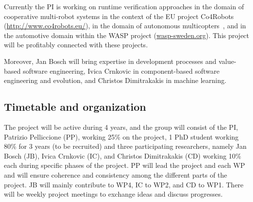 \documentclass[12pt]{article}
\newcommand{\nb}[2]{
    \fcolorbox{gray}{yellow}{\bfseries\sffamily\scriptsize#1}
    {\sf\small$\blacktriangleright$\textit{#2}$\blacktriangleleft$}
   }
\newcommand{\nb}[2]{}
\newcommand\patrizio[1]{\nb{Patrizio}{#1}}
\begin{document}
Currently the PI is working on runtime verification approaches in the domain of cooperative multi-robot systems in the context of the EU project Co4Robots ({\small \url{http://www.co4robots.eu/}}), in the domain of 
autonomous multicopters~\cite{ASE2015}, and in the automotive domain within the WASP project ({\small \url{wasp-sweden.org}}). This project will be profitably connected with these projects. %

Moreover, Jan Bosch will bring expertise in development processes and value-based software engineering, Ivica Crnkovic in component-based software engineering and evolution, and Christos Dimitrakakis in machine learning. 

\subsection{Timetable and organization}
\vspace{-.2cm}
The \name{} project will be active during 4 years, and the group will consist of the PI, Patrizio Pelliccione (PP), working
25\% on the project, 1 PhD student working 80\%  for 3 years (to be recruited) and three participating researchers, namely Jan Bosch (JB), Ivica Crnkovic (IC), and Christos Dimitrakakis (CD) working 10\% each during specific phases of the project.  PP will lead the project and each WP and will ensure coherence and consistency among the different parts of the project. JB will mainly contribute to WP4, IC to WP2, and CD to WP1. There will be weekly project meetings to exchange ideas and discuss progresses.
\end{document}
